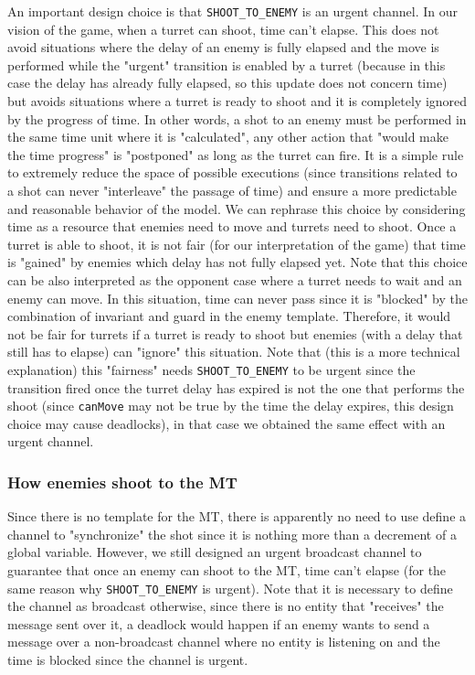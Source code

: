 \documentclass[
10pt, %
a4paper, %
oneside, %
headinclude,footinclude, %
BCOR5mm, %
]{scrartcl}
\begin{document}
				An important design choice is that \texttt{SHOOT\_TO\_ENEMY} is an urgent channel. In our vision of the game, when a turret can shoot, time can't elapse. This does not avoid situations where the delay of an enemy is fully elapsed and the move is performed while the "urgent" transition is enabled by a turret (because in this case the delay has already fully elapsed, so this update does not concern time) but avoids situations where a turret is ready to shoot and it is completely ignored by the progress of time. In other words, a shot to an enemy must be performed in the same time unit where it is "calculated", any other action that "would make the time progress" is "postponed" as long as the turret can fire. It is a simple rule to extremely reduce the space of possible executions (since transitions related to a shot can never "interleave" the passage of time) and ensure a more predictable and reasonable behavior of the model. We can rephrase this choice by considering time as a resource that enemies need to move and turrets need to shoot. Once a turret is able to shoot, it is not fair (for our interpretation of the game) that time is "gained" by enemies which delay has not fully elapsed yet. Note that this choice can be also interpreted as the opponent case where a turret needs to wait and an enemy can move. In this situation, time can never pass since it is "blocked" by the combination of invariant and guard in the enemy template. Therefore, it would not be fair for turrets if a turret is ready to shoot but enemies (with a delay that still has to elapse) can "ignore" this situation. Note that (this is a more technical explanation) this "fairness" needs \texttt{SHOOT\_TO\_ENEMY} to be urgent since the transition fired once the turret delay has expired is not the one that performs the shoot (since \texttt{canMove} may not be true by the time the delay expires, this design choice may cause deadlocks), in that case we obtained the same effect with an urgent channel.
			\subsubsection{How enemies shoot to the MT}
				Since there is no template for the MT, there is apparently no need to use define a channel to "synchronize" the shot since it is nothing more than a decrement of a global variable. However, we still designed an urgent broadcast channel to guarantee that once an enemy can shoot to the MT, time can't elapse (for the same reason why \texttt{SHOOT\_TO\_ENEMY} is urgent). Note that it is necessary to define the channel as broadcast otherwise, since there is no entity that "receives" the message sent over it, a deadlock would happen if an enemy wants to send a message over a non-broadcast channel where no entity is listening on and the time is blocked since the channel is urgent.
\end{document}
